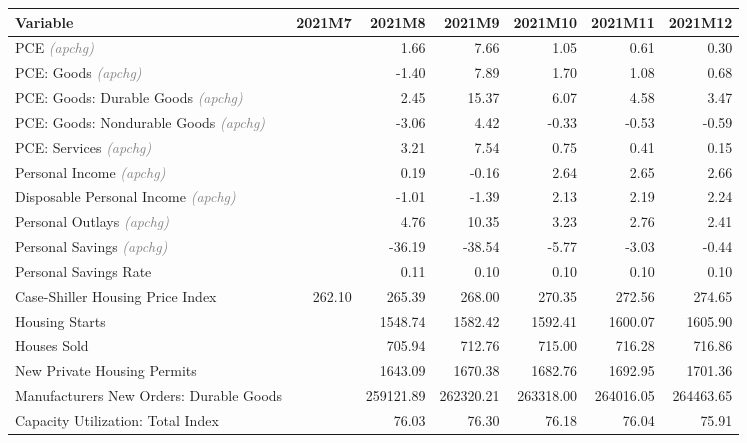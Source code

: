 \documentclass[11pt, letterpaper]{article}\usepackage[]{graphicx}\usepackage[]{color}
\begin{document}
\begin{table}[H]
\centering
\begingroup\fontsize{10pt}{12pt}\selectfont
\begin{tabular}{lrrrrrr}
  \hline
Variable & 2021M7 & 2021M8 & 2021M9 & 2021M10 & 2021M11 & 2021M12 \\ 
  \hline
PCE \textit{\footnotesize\textcolor{gray}{(apchg)}} &  & 1.66 & 7.66 & 1.05 & 0.61 & 0.30 \\ 
  PCE: Goods \textit{\footnotesize\textcolor{gray}{(apchg)}} &  & -1.40 & 7.89 & 1.70 & 1.08 & 0.68 \\ 
  PCE: Goods: Durable Goods \textit{\footnotesize\textcolor{gray}{(apchg)}} &  & 2.45 & 15.37 & 6.07 & 4.58 & 3.47 \\ 
  PCE: Goods: Nondurable Goods \textit{\footnotesize\textcolor{gray}{(apchg)}} &  & -3.06 & 4.42 & -0.33 & -0.53 & -0.59 \\ 
  PCE: Services \textit{\footnotesize\textcolor{gray}{(apchg)}} &  & 3.21 & 7.54 & 0.75 & 0.41 & 0.15 \\ 
  Personal Income \textit{\footnotesize\textcolor{gray}{(apchg)}} &  & 0.19 & -0.16 & 2.64 & 2.65 & 2.66 \\ 
  Disposable Personal Income \textit{\footnotesize\textcolor{gray}{(apchg)}} &  & -1.01 & -1.39 & 2.13 & 2.19 & 2.24 \\ 
  Personal Outlays \textit{\footnotesize\textcolor{gray}{(apchg)}} &  & 4.76 & 10.35 & 3.23 & 2.76 & 2.41 \\ 
  Personal Savings \textit{\footnotesize\textcolor{gray}{(apchg)}} &  & -36.19 & -38.54 & -5.77 & -3.03 & -0.44 \\ 
  Personal Savings Rate &  & 0.11 & 0.10 & 0.10 & 0.10 & 0.10 \\ 
  Case-Shiller Housing Price Index & 262.10 & 265.39 & 268.00 & 270.35 & 272.56 & 274.65 \\ 
  Housing Starts &  & 1548.74 & 1582.42 & 1592.41 & 1600.07 & 1605.90 \\ 
  Houses Sold &  & 705.94 & 712.76 & 715.00 & 716.28 & 716.86 \\ 
  New Private Housing Permits &  & 1643.09 & 1670.38 & 1682.76 & 1692.95 & 1701.36 \\ 
  Manufacturers New Orders: Durable Goods &  & 259121.89 & 262320.21 & 263318.00 & 264016.05 & 264463.65 \\ 
  Capacity Utilization: Total Index &  & 76.03 & 76.30 & 76.18 & 76.04 & 75.91 \\ 

\end{tabular}
\end{table}
\end{document}
